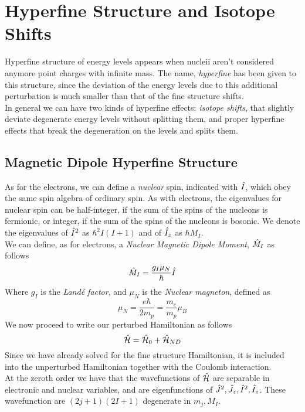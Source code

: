\documentclass[../qm.tex]{subfiles}
\begin{document}
	\section{Hyperfine Structure and Isotope Shifts}
	Hyperfine structure of energy levels appears when nucleii aren't considered anymore point charges with infinite mass. The name, \textit{hyperfine} has been given to this structure, since the deviation of the energy levels due to this additional perturbation is much smaller than that of the fine structure shifts.\\
	In general we can have two kinds of hyperfine effects: \textit{isotope shifts}, that slightly deviate degenerate energy levels without splitting them, and proper hyperfine effects that break the degeneration on the levels and splits them.\\
	\subsection{Magnetic Dipole Hyperfine Structure}
	As for the electrons, we can define a \textit{nuclear} spin, indicated with $\hat{I}$, which obey the same spin algebra of ordinary spin. As with electrons, the eigenvalues for nuclear spin can be half-integer, if the sum of the spins of the nucleons is fermionic, or integer, if the sum of the spins of the nucleons is bosonic. We denote the eigenvalues of $\hat{I}^2$ as $\hbar^2I(I+1)$ and of $\hat{I}_z$ as $\hbar M_I$.\\
	We can define, as for electrons, a \textit{Nuclear Magnetic Dipole Moment}, $\hat{M}_I$ as follows
	\begin{equation}
		\hat{M}_I=\frac{g_I\mu_N}{\hbar}\hat{I}
		\label{eq:nucleardipolemoment}
	\end{equation}
	Where $g_I$ is the \textit{Landé factor}, and $\mu_N$ is the \textit{Nuclear magneton}, defined as
	\begin{equation}
		\mu_N=\frac{e\hbar}{2m_p}=\frac{m_e}{m_p}\mu_B
		\label{eq:nuclearmagneton}
	\end{equation}
	We now proceed to write our perturbed Hamiltonian as follows
	\begin{equation}
		\hat{\mathcal{H}}=\hat{\mathcal{H}}_0+\hat{\mathcal{H}}_{ND}
		\label{eq:pertrel}
	\end{equation}
	Since we have already solved for the fine structure Hamiltonian, it is included into the unperturbed Hamiltonian together with the Coulomb interaction.\\
	At the zeroth order we have that the wavefunctions of $\hat{\mathcal{H}}$ are separable in electronic and nuclear variables, and are eigenfunctions of $\hat{J}^2,\hat{J}_z,\hat{I}^2,\hat{I}_z$. These wavefunction are $(2j+1)(2I+1)$ degenerate in $m_j,M_I$.\\
\end{document}

